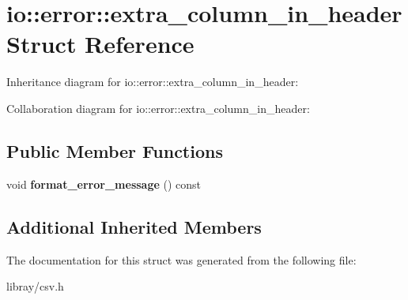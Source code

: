 \hypertarget{structio_1_1error_1_1extra__column__in__header}{}\section{io\+:\+:error\+:\+:extra\+\_\+column\+\_\+in\+\_\+header Struct Reference}
\label{structio_1_1error_1_1extra__column__in__header}


Inheritance diagram for io\+:\+:error\+:\+:extra\+\_\+column\+\_\+in\+\_\+header\+:


Collaboration diagram for io\+:\+:error\+:\+:extra\+\_\+column\+\_\+in\+\_\+header\+:
\subsection*{Public Member Functions}
\begin{DoxyCompactItemize}
\item 
\mbox{\label{structio_1_1error_1_1extra__column__in__header_ab7bb962a470c429206c51729fbf114dd}} 
void {\bfseries format\+\_\+error\+\_\+message} () const
\end{DoxyCompactItemize}
\subsection*{Additional Inherited Members}


The documentation for this struct was generated from the following file\+:\begin{DoxyCompactItemize}
\item 
libray/csv.\+h\end{DoxyCompactItemize}
